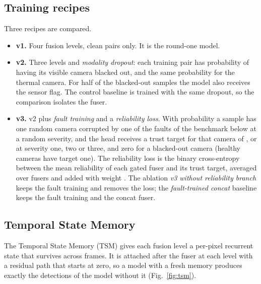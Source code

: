 \subsection{Training recipes}
\label{sec:recipes}
Three recipes are compared.
\begin{itemize}
\item \textbf{v1.} Four fusion levels, clean pairs only. It is the round-one model.
\item \textbf{v2.} Three levels and \emph{modality dropout}: each training pair has probability \cfgMdProb{} of having its visible camera blacked out, and the same probability for the thermal camera. For half of the blacked-out samples the model also receives the sensor flag. The control baseline is trained with the same dropout, so the comparison isolates the fuser.
\item \textbf{v3.} v2 plus \emph{fault training} and a \emph{reliability loss}. With probability \cfgFaultProb{} a sample has one random camera corrupted by one of the faults of the benchmark below at a random severity, and the head receives a trust target for that camera of \cfgTrustOne{}, \cfgTrustTwo{} or \cfgTrustThree{} at severity one, two or three, and zero for a blacked-out camera (healthy cameras have target one). The reliability loss is the binary cross-entropy between the mean reliability of each gated fuser and its trust target, averaged over fusers and added with weight \cfgRelWeight{}. The ablation \emph{v3 without reliability branch} keeps the fault training and removes the loss; the \emph{fault-trained concat} baseline keeps the fault training and the concat fuser.
\end{itemize}

\subsection{Temporal State Memory}
\label{sec:tsm}
The Temporal State Memory (TSM) gives each fusion level a per-pixel recurrent state that survives across frames. It is attached after the fuser at each level with a residual path that starts at zero, so a model with a fresh memory produces exactly the detections of the model without it (Fig.~\ref{fig:tsm}).


